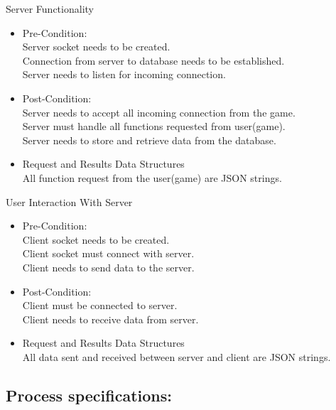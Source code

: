 \documentclass[letterpaper]{article}
\begin{document}
				\vspace{0.1in}
					\hspace{5mm}Server Functionality
					\begin{itemize}
						\item Pre-Condition: \\
							Server socket needs to be created. \\
							Connection from server to database needs to be established. \\
							Server needs to listen for incoming connection.
						\item Post-Condition: \\
							Server needs to accept all incoming connection from the game. \\
							Server must handle all functions requested from user(game).\\
							Server needs to store and retrieve data from the database.			
						\item Request and Results Data Structures \\
							All function request from the user(game) are JSON strings. 
						
					\end{itemize}
					
					\vspace{0.1in}
					User Interaction With Server
					\begin{itemize}
						\item Pre-Condition: \\
							Client socket needs to be created. \\
							Client socket must connect with server. \\
							Client needs to send data to the server. 
						\item Post-Condition: \\
							Client must be connected to server. \\
							Client needs to receive data from server.			
						\item Request and Results Data Structures \\
							All data sent and received between server and client are JSON strings.						
					\end{itemize}
					
			\vspace{0.2in}
			\subsection*{Process specifications:}
			\vspace{0.1in}
			
\end{document}

